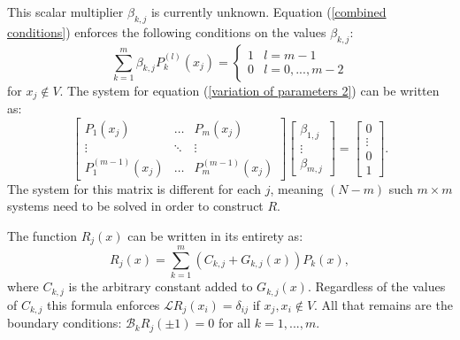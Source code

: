 \documentclass{sfuthesis}
\begin{document}
This scalar multiplier $\beta_{k,j}$ is currently unknown.
Equation (\ref{combined conditions}) enforces the following conditions on the values $\beta_{k,j}$:
\begin{equation} \label{variation of parameters 2}
\sum_{k=1}^m \beta_{k,j} P_k^{(l)}(x_j) = \begin{cases} 1 & l = m-1 \\ 0 & l =0,...,m-2 \end{cases}
\end{equation}
for $x_j \notin V$.
The system for equation (\ref{variation of parameters 2}) can be written as:
\begin{equation} \label{eq:betas}
\begin{bmatrix} P_1(x_j) & \dots & P_m(x_j)
\\ \vdots & \ddots & \vdots
\\ P_1^{(m-1)}(x_j) & \dots & P_m^{(m-1)}(x_j) \end{bmatrix}
\begin{bmatrix} \beta_{1,j} \\ \vdots \\ \beta_{m,j} \end{bmatrix} =
\begin{bmatrix} 0 \\ \vdots \\ 0 \\ 1 \end{bmatrix} .
\end{equation}
The system for this matrix is different for each $j$, meaning $(N - m)$ such $m \times m$ systems need to be solved in order to construct $R$.

The function $R_j(x)$ can be written in its entirety as:
\begin{equation}
R_j(x) = \sum_{k=1}^m (C_{k,j} + G_{k,j}(x) ) P_k(x) ,
\end{equation}
where $C_{k,j}$ is the arbitrary constant added to $G_{k,j}(x)$.
Regardless of the values of $C_{k,j}$ this formula enforces $\mathcal{L} R_j(x_i) = \delta_{ij}$ if $x_j, x_i \notin V$.
All that remains are the boundary conditions: $\mathcal{B}_k R_j( \pm 1) = 0$ for all $k = 1,...,m$.
\end{document}
